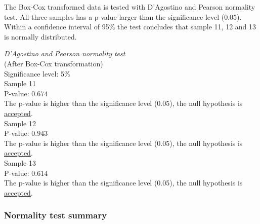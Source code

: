 The Box-Cox transformed data is tested with D'Agostino and Pearson normality test. All three samples has a p-value larger than the significance level (0.05). Within a confidence interval of 95\% the test concludes that sample 11, 12 and 13 is normally distributed.

 \begin{center}
	\begin{tcolorbox}[box align=center,width=\textwidth-5cm]
		\centering
		\textit{D'Agostino and Pearson normality test}\\
		(After Box-Cox transformation) \\
		Significance level: 5\%  \\[0.5cm]
		
		Sample 11 \\
		P-value: $0.674$\\
		The p-value is higher than the significance level (0.05), the null hypothesis is \underline{accepted}. \\[0.5cm]
		
		Sample 12 \\
		P-value: $0.943$ \\
		The p-value is higher than the significance level (0.05), the null hypothesis is \underline{accepted}. \\[0.5cm]
		
		Sample 13 \\
		P-value: $0.614$ \\
		The p-value is higher than the significance level (0.05), the null hypothesis is \underline{accepted}. \\[0.5cm]
	\end{tcolorbox} 
\end{center}

\subsubsection{Normality test summary}\label{sec:normaltest_summary}

